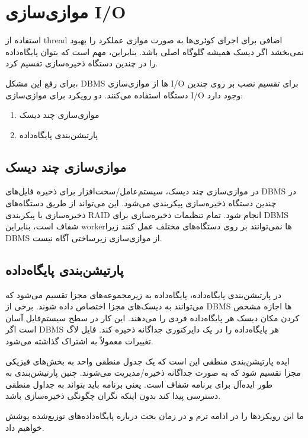 \section{موازی‌سازی I/O}
استفاده از thread اضافی برای اجرای کوئری‌ها به صورت موازی عملکرد را بهبود نمی‌بخشد اگر دیسک همیشه گلوگاه اصلی باشد. بنابراین، مهم است که بتوان پایگاه‌داده را در چندین دستگاه ذخیره‌سازی تقسیم کرد.

برای رفع این مشکل، DBMS ها از موازی‌سازی I/O برای تقسیم نصب بر روی چندین دستگاه استفاده می‌کنند. دو رویکرد برای موازی‌سازی I/O وجود دارد: 
\begin{enumerate}
	\item موازی‌سازی چند دیسک
	\item پارتیشن‌بندی پایگاه‌داده
\end{enumerate}

\subsection{موازی‌سازی چند دیسک}
در موازی‌سازی چند دیسک، سیستم‌عامل/سخت‌افزار برای ذخیره فایل‌های DBMS در چندین دستگاه ذخیره‌سازی پیکربندی می‌شود. این می‌تواند از طریق دستگاه‌های ذخیره‌سازی یا پیکربندی RAID انجام شود. تمام تنظیمات ذخیره‌سازی برای DBMS شفاف است، بنابراین workerها نمی‌توانند بر روی دستگاه‌های مختلف عمل کنند زیرا DBMS از موازی‌سازی زیرساختی آگاه نیست.

\subsection{پارتیشن‌بندی پایگاه‌داده}
در پارتیشن‌بندی پایگاه‌داده، پایگاه‌داده به زیرمجموعه‌های مجزا تقسیم می‌شود که می‌توانند به دیسک‌های مجزا اختصاص داده شوند. برخی از DBMS ها اجازه مشخص کردن مکان دیسک هر پایگاه‌داده فردی را می‌دهند. این کار در سطح سیستم‌فایل آسان است اگر DBMS هر پایگاه‌داده را در یک دایرکتوری جداگانه ذخیره کند. فایل لاگ تغییرات معمولاً به اشتراک گذاشته می‌شود.

ایده پارتیشن‌بندی منطقی این است که یک جدول منطقی واحد به بخش‌های فیزیکی مجزا تقسیم شود که به صورت جداگانه ذخیره/مدیریت می‌شوند. چنین پارتیشن‌بندی به طور ایده‌آل برای برنامه شفاف است. یعنی برنامه باید بتواند به جداول منطقی دسترسی پیدا کند بدون اینکه نگران چگونگی ذخیره‌سازی باشد.

ما این رویکردها را در ادامه ترم و در زمان بحث درباره پایگاه‌داده‌های توزیع‌شده پوشش خواهیم داد.






